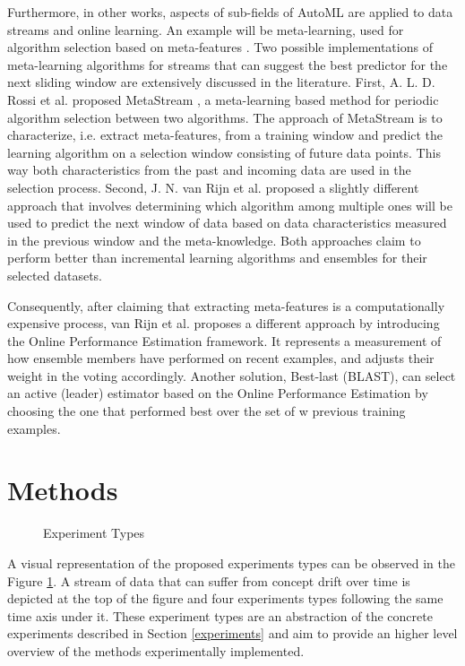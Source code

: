 \documentclass{sig-alternate-br}
\begin{document}
Furthermore, in other works, aspects of sub-fields of AutoML are applied to data streams and online learning. An example will be meta-learning, used for algorithm selection based on meta-features \cite{rossi2017guidance}. Two possible implementations of meta-learning algorithms for streams that can suggest the best predictor for the next sliding window are extensively discussed in the literature. First, A. L. D. Rossi et al. proposed MetaStream \cite{rossi2014metastream}, a meta-learning based method for periodic algorithm selection between two algorithms. The approach of MetaStream is to characterize, i.e. extract meta-features, from a training window and predict the learning algorithm on a selection window consisting of future data points. This way both characteristics from the past and incoming data are used in the selection process. Second, J. N. van Rijn et al. \cite{van2014algorithm} proposed a slightly different approach that involves determining which algorithm among multiple ones will be used to predict the next window of data based on data characteristics measured in the previous window and the meta-knowledge. Both approaches claim to perform better than incremental learning algorithms and ensembles for their selected datasets.

Consequently, after claiming that extracting meta-features is a computationally expensive process, van Rijn et al. \cite{van2018online} proposes a different approach by introducing the Online Performance Estimation framework. It represents a measurement of how ensemble members have performed on recent examples, and adjusts their weight in the voting accordingly. Another solution, Best-last (BLAST), can select an active (leader) estimator based on the Online Performance Estimation by choosing the one that performed best over the set of w previous training examples.

\section{Methods}
\label{methods}

\begin{figure}
\centering 
{}
\caption{Experiment Types}
\label{fig:experiments}
\end{figure}

A visual representation of the proposed experiments types can be observed in the Figure \ref{fig:experiments}. A stream of data that can suffer from concept drift over time is depicted at the top of the figure and four experiments types following the same time axis under it. These experiment types are an abstraction of the concrete experiments described in Section \ref{experiments} and aim to provide an higher level overview of the methods experimentally implemented.
\end{document}
